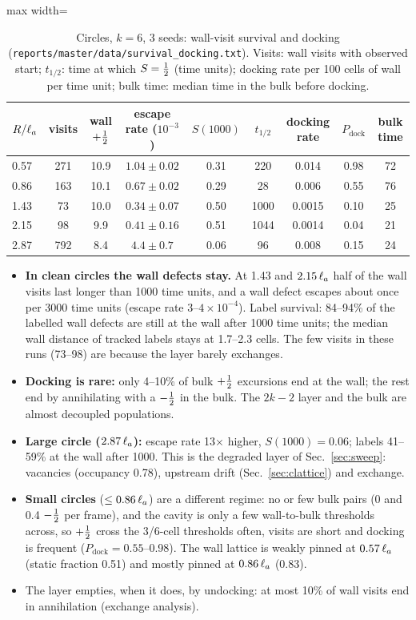 \begin{table}[H]\centering\small
\caption{Circles, $k=6$, 3 seeds: wall-visit survival and docking (\texttt{reports/master/data/survival\_docking.txt}).
Visits: wall visits with observed start; $t_{1/2}$: time at which $S=\tfrac12$ (time units); docking rate per 100 cells of wall per time unit; bulk time: median time in the bulk before docking.}\label{tab:csurv}
\begin{adjustbox}{max width=\textwidth}
\begin{tabular}{lcccccccc}\toprule
$R/\ell_a$ & visits & wall $+\tfrac12$ & escape rate ($10^{-3}$) & $S(1000)$ & $t_{1/2}$ & docking rate & $P_\mathrm{dock}$ & bulk time\\\midrule
0.57 & 271 & 10.9 & $1.04\pm0.02$ & 0.31 & 220 & 0.014 & 0.98 & 72\\
0.86 & 163 & 10.1 & $0.67\pm0.02$ & 0.29 & 28 & 0.006 & 0.55 & 76\\
1.43 & 73 & 10.0 & $0.34\pm0.07$ & 0.50 & 1000 & 0.0015 & 0.10 & 25\\
2.15 & 98 & 9.9 & $0.41\pm0.16$ & 0.51 & 1044 & 0.0014 & 0.04 & 21\\
2.87 & 792 & 8.4 & $4.4\pm0.7$ & 0.06 & 96 & 0.008 & 0.15 & 24\\\bottomrule
\end{tabular}
\end{adjustbox}
\end{table}
\begin{itemize}
  \item \textbf{In clean circles the wall defects stay.} At 1.43 and $2.15\,\ell_a$ half of the wall visits last longer than 1000
        time units, and a wall defect escapes about once per 3000 time units (escape rate $3$--$4\times10^{-4}$). Label survival:
        84--94\% of the labelled wall defects are still at the wall after 1000 time units; the median wall distance of tracked labels
        stays at 1.7--2.3 cells. The few visits in these runs (73--98) are because the layer barely exchanges.
  \item \textbf{Docking is rare:} only 4--10\% of bulk $+\tfrac12$ excursions end at the wall; the rest end by annihilating with a
        $-\tfrac12$ in the bulk. The $2k-2$ layer and the bulk are almost decoupled populations.
  \item \textbf{Large circle ($2.87\,\ell_a$):} escape rate 13$\times$ higher, $S(1000)=0.06$; labels 41--59\% at the wall after 1000.
        This is the degraded layer of Sec.~\ref{sec:sweep}: vacancies (occupancy 0.78), upstream drift (Sec.~\ref{sec:clattice}) and
        exchange.
  \item \textbf{Small circles} ($\le0.86\,\ell_a$) are a different regime: no or few bulk pairs (0 and 0.4 $-\tfrac12$ per frame), and
        the cavity is only a few wall-to-bulk thresholds across, so $+\tfrac12$ cross the 3/6-cell thresholds often, visits are short and
        docking is frequent ($P_\mathrm{dock}=0.55$--0.98). The wall lattice is weakly pinned at $0.57\,\ell_a$ (static fraction 0.51)
        and mostly pinned at $0.86\,\ell_a$ (0.83).
  \item The layer empties, when it does, by undocking: at most 10\% of wall visits end in annihilation (exchange analysis).
\end{itemize}
